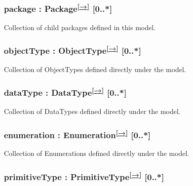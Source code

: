 \documentclass[10pt,a4paper]{ivoa}
\begin{document}
\hypertarget{package-package-0..-1}{%
\subsubsection{\texorpdfstring{package :
Package\textsuperscript{{[}\protect\hyperlink{package-extends-referableelement}{→}{]}}
{[}0..*{]}}{package : Package{[}→{]} {[}0..*{]}}}\label{package-package-0..-1}}

Collection of child packages defined in this model.

\hypertarget{objecttype-objecttype-0..-1}{%
\subsubsection{\texorpdfstring{objectType :
ObjectType\textsuperscript{{[}\protect\hyperlink{objecttype-extends-type}{→}{]}}
{[}0..*{]}}{objectType : ObjectType{[}→{]} {[}0..*{]}}}\label{objecttype-objecttype-0..-1}}

Collection of ObjectTypes defined directly under the model.

\hypertarget{datatype-datatype-0..-1}{%
\subsubsection{\texorpdfstring{dataType :
DataType\textsuperscript{{[}\protect\hyperlink{datatype-extends-valuetype}{→}{]}}
{[}0..*{]}}{dataType : DataType{[}→{]} {[}0..*{]}}}\label{datatype-datatype-0..-1}}

Collection of DataTypes defined directly under the model.

\hypertarget{enumeration-enumeration-0..-1}{%
\subsubsection{\texorpdfstring{enumeration :
Enumeration\textsuperscript{{[}\protect\hyperlink{enumeration-extends-valuetype}{→}{]}}
{[}0..*{]}}{enumeration : Enumeration{[}→{]} {[}0..*{]}}}\label{enumeration-enumeration-0..-1}}

Collection of Enumerations defined directly under the model.

\hypertarget{primitivetype-primitivetype-0..-1}{%
\subsubsection{\texorpdfstring{primitiveType :
PrimitiveType\textsuperscript{{[}\protect\hyperlink{_Type_extends_ReferencableElement}{→}{]}}
{[}0..*{]}}{primitiveType : PrimitiveType{[}→{]} {[}0..*{]}}}\label{primitivetype-primitivetype-0..-1}}
\end{document}
